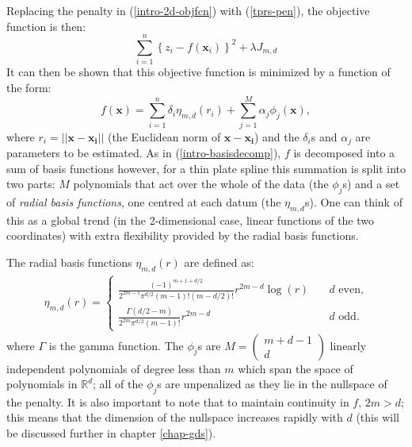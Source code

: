 Replacing the penalty in (\ref{intro-2d-objfcn}) with (\ref{tprs-pen}), the objective function is then:
\begin{equation*}
\sum_{i=1}^n \left \{ z_i - f(\mathbf{x}_i) \right \}^2 +  \lambda J_{m,d}
\end{equation*}
It can then be shown that this objective function is minimized by a function of the form:
\begin{equation}
f(\mathbf{x}) = \sum_{i=1}^n \delta_i \eta_{m,d}(r_i) + \sum_{j=1}^M \alpha_j \phi_j(\mathbf{x}),
\label{tprs-basis} 
\end{equation}
where $r_i=\lvert \lvert \mathbf{x}-\mathbf{x_i}\rvert \rvert$ (the Euclidean norm of $ \mathbf{x}-\mathbf{x_i}$) and the $\delta_i$s and $\alpha_j$ are parameters to be estimated. As in (\ref{intro-basisdecomp}), $f$ is decomposed into a sum of basis functions however, for a thin plate spline this summation is split into two parts: $M$ polynomials that act over the whole of the data (the $\phi_j$s) and a set of \textit{radial basis functions}, one centred at each datum (the $\eta_{m,d}$s). One can think of this as a global trend (in the 2-dimensional case, linear functions of the two coordinates) with extra flexibility provided by the radial basis functions.

The radial basis functions $\eta_{m,d}(r)$ are defined as:
\begin{align*}
\eta_{m,d}(r) =\begin{cases} \frac{(-1)^{m+1+d/2}}{2^{2m-1}\pi^{d/2}(m-1)!(m-d/2)!} r^{2m-d} \log(r) &\quad{\text{$d$ even,}}\\
\frac{\Gamma(d/2-m)}{2^{2m}\pi^{d/2}(m-1)!} r^{2m-d} &\quad{\text{$d$ odd.}}
\end{cases}
\end{align*}
where $\Gamma$ is the gamma function. The $\phi_j$s are $M=\left( \begin{smallmatrix} m+d-1 \\ d  \end{smallmatrix}\right)$ linearly independent polynomials of degree less than $m$ which span the space of polynomials in $\mathbb{R}^d$; all of the $\phi_j$s are unpenalized as they lie in the nullspace of the penalty. It is also important to note that to maintain continuity in $f$, $2m>d$; this means that the dimension of the nullspace increases rapidly with $d$ (this will be discussed further in chapter \ref{chap-gds}).

